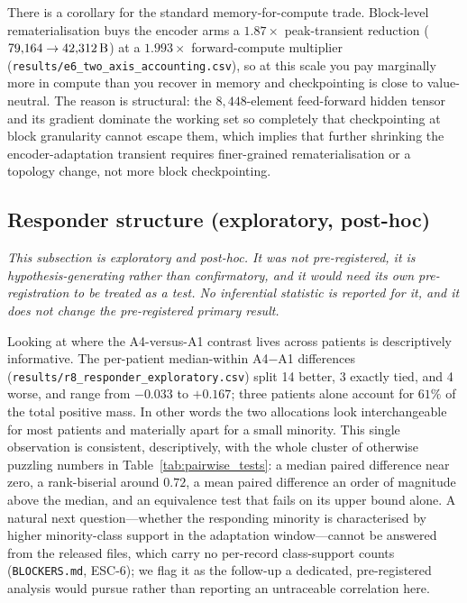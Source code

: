 There is a corollary for the standard memory-for-compute trade. Block-level
rematerialisation buys the encoder arms a $1.87\times$ peak-transient reduction
($79{,}164 \to 42{,}312\,\mathrm{B}$) at a $1.993\times$ forward-compute multiplier
(\texttt{results/e6\_two\_axis\_accounting.csv}), so at this scale you pay
marginally more in compute than you recover in memory and checkpointing is close
to value-neutral. The reason is structural: the $8{,}448$-element feed-forward
hidden tensor and its gradient dominate the working set so completely that
checkpointing at block granularity cannot escape them, which implies that further
shrinking the encoder-adaptation transient requires finer-grained
rematerialisation or a topology change, not more block checkpointing.

\subsection{Responder structure (exploratory, post-hoc)}

\emph{This subsection is exploratory and post-hoc. It was not pre-registered, it
is hypothesis-generating rather than confirmatory, and it would need its own
pre-registration to be treated as a test. No inferential statistic is reported for
it, and it does not change the pre-registered primary result.}

Looking at where the A4-versus-A1 contrast lives across patients is descriptively
informative. The per-patient median-within A4$-$A1 differences
(\texttt{results/r8\_responder\_exploratory.csv}) split 14 better, 3 exactly
tied, and 4 worse, and range from $-0.033$ to $+0.167$; three patients alone
account for $61\%$ of the total positive mass. In other words the two allocations
look interchangeable for most patients and materially apart for a small
minority. This single observation is consistent, descriptively, with the whole
cluster of otherwise puzzling numbers in Table~\ref{tab:pairwise_tests}: a median
paired difference near zero, a rank-biserial around $0.72$, a mean paired
difference an order of magnitude above the median, and an equivalence test that
fails on its upper bound alone. A natural next question---whether the responding
minority is characterised by higher minority-class support in the adaptation
window---cannot be answered from the released files, which carry no per-record
class-support counts (\texttt{BLOCKERS.md}, ESC-6); we flag it as the follow-up a
dedicated, pre-registered analysis would pursue rather than reporting an untraceable
correlation here.


